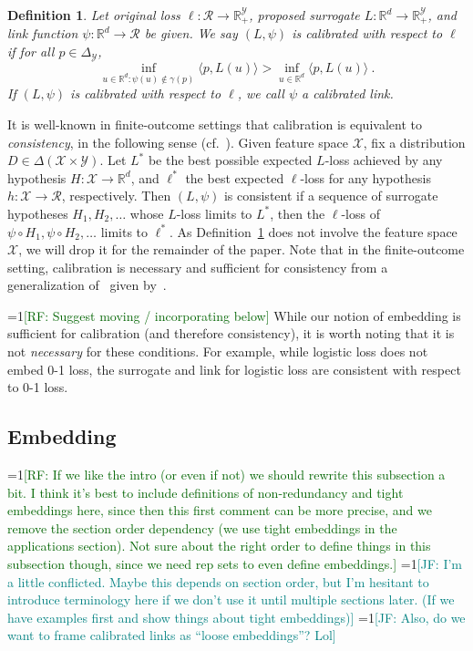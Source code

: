 \documentclass[11pt]{article}
\newcommand{\Comments}{1}
\newcommand{\mynote}[2]{\ifnum\Comments=1\textcolor{#1}{#2}\fi}
\newcommand{\raf}[1]{\mynote{darkgreen}{[RF: #1]}}
\newcommand{\jessie}[1]{\mynote{teal}{[JF: #1]}}
\newcommand{\reals}{\mathbb{R}}
\newcommand{\simplex}{\Delta_\Y}
\newcommand{\R}{\mathcal{R}}
\newcommand{\X}{\mathcal{X}}
\newcommand{\Y}{\mathcal{Y}}
\newcommand{\inprod}[2]{\langle #1, #2 \rangle}%
\newtheorem{definition}{Definition}
\begin{document}
\begin{definition}
  \label{def:calibrated}
  Let original loss $\ell:\R\to\reals^\Y_+$, proposed surrogate $L:\reals^d\to\reals^\Y_+$, and link function $\psi:\reals^d\to\R$ be given.
  We say $(L,\psi)$ is \emph{calibrated} with respect to $\ell$ if
for all $p \in \simplex$,
  \begin{equation}
    \label{eq:calibrated}
  \inf_{u \in \reals^d : \psi(u) \not\in \gamma(p)} \inprod{p}{L(u)} > \inf_{u \in \reals^d} \inprod{p}{L(u)}~.
  \end{equation}
  If $(L, \psi)$ is calibrated with respect to $\ell$, we call $\psi$ a \emph{calibrated link.}
\end{definition}
It is well-known in finite-outcome settings that calibration is equivalent to \emph{consistency}, in the following sense (cf.~\citep{agarwal2015consistent}).
Given feature space $\X$, fix a distribution $D \in \Delta(\X\times\Y)$.
Let $L^*$ be the best possible expected $L$-loss achieved by any hypothesis $H:\X\to\reals^d$, and $\ell^*$ the best expected $\ell$-loss for any hypothesis $h:\X\to\R$, respectively.
Then $(L,\psi)$ is consistent if a sequence of surrogate hypotheses $H_1,H_2,\ldots$ whose $L$-loss limits to $L^*$, then the $\ell$-loss of $\psi\circ H_1,\psi \circ H_2, \ldots$ limits to $\ell^*$.
As Definition~\ref{def:calibrated} does not involve the feature space $\X$, we will drop it for the remainder of the paper.
Note that in the finite-outcome setting, calibration is necessary and sufficient for consistency from a generalization of~\citet{tewari2007consistency} given by~\citet{ramaswamy2016convex}.  

\raf{Suggest moving / incorporating below}
While our notion of embedding is sufficient for calibration (and therefore consistency), it is worth noting that it is not \emph{necessary} for these conditions.  
For example, while logistic loss does not embed 0-1 loss, the surrogate and link for logistic loss are consistent with respect to 0-1 loss.

\subsection{Embedding}

\raf{If we like the intro (or even if not) we should rewrite this subsection a bit.  I think it's best to include definitions of non-redundancy and tight embeddings here, since then this first comment can be more precise, and we remove the section order dependency (we use tight embeddings in the applications section).  Not sure about the right order to define things in this subsection though, since we need rep sets to even define embeddings.}
\jessie{I'm a little conflicted.  Maybe this depends on section order, but I'm hesitant to introduce terminology here if we don't use it until multiple sections later.  (If we have examples first and show things about tight embeddings)}
\jessie{Also, do we want to frame calibrated links as ``loose embeddings''? Lol}
\end{document}
